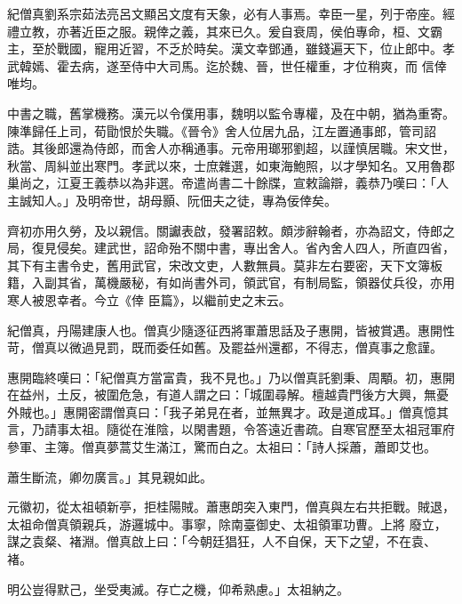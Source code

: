 
\begin{pinyinscope}

 紀僧真劉系宗茹法亮呂文顯呂文度有天象，必有人事焉。幸臣一星，列于帝座。經禮立教，亦著近臣之服。親倖之義，其來已久。爰自衰周，侯伯專命，桓、文霸主，至於戰國，寵用近習，不乏於時矣。漢文幸鄧通，雖錢遍天下，位止郎中。孝武韓嫣、霍去病，遂至侍中大司馬。迄於魏、晉，世任權重，才位稍爽，而
 信倖唯均。



 中書之職，舊掌機務。漢元以令僕用事，魏明以監令專權，及在中朝，猶為重寄。陳準歸任上司，荀勖恨於失職。《晉令》舍人位居九品，江左置通事郎，管司詔誥。其後郎還為侍郎，而舍人亦稱通事。元帝用瑯邪劉超，以謹慎居職。宋文世，秋當、周糾並出寒門。孝武以來，士庶雜選，如東海鮑照，以才學知名。又用魯郡巢尚之，江夏王義恭以為非選。帝遣尚書二十餘牒，宣敕論辯，義恭乃嘆曰：「人主誠知人。」及明帝世，胡母顥、阮佃夫之徒，專為佞倖矣。



 齊初亦用久勞，及以親信。關讞表啟，發署詔敕。頗涉辭翰者，亦為詔文，侍郎之局，復見侵矣。建武世，詔命殆不關中書，專出舍人。省內舍人四人，所直四省，其下有主書令史，舊用武官，宋改文吏，人數無員。莫非左右要密，天下文簿板籍，入副其省，萬機嚴秘，有如尚書外司，領武官，有制局監，領器仗兵役，亦用寒人被恩幸者。今立《倖
 臣篇》，以繼前史之末云。



 紀僧真，丹陽建康人也。僧真少隨逐征西將軍蕭思話及子惠開，皆被賞遇。惠開性苛，僧真以微過見罰，既而委任如舊。及罷益州還都，不得志，僧真事之愈謹。



 惠開臨終嘆曰：「紀僧真方當富貴，我不見也。」乃以僧真託劉秉、周顒。初，惠開在益州，土反，被圍危急，有道人謂之曰：「城圍尋解。檀越貴門後方大興，無憂外賊也。」惠開密謂僧真曰：「我子弟見在者，並無異才。政是道成耳。」僧真憶其言，乃請事太祖。隨從在淮陰，以閑書題，令答遠近書疏。自寒官歷至太祖冠軍府參軍、主簿。僧真夢蒿艾生滿江，驚而白之。太祖曰：「詩人採蕭，蕭即艾也。



 蕭生斷流，卿勿廣言。」其見親如此。



 元徽初，從太祖頓新亭，拒桂陽賊。蕭惠朗突入東門，僧真與左右共拒戰。賊退，太祖命僧真領親兵，游邏城中。事寧，除南臺御史、太祖領軍功曹。上將
 廢立，謀之袁粲、褚淵。僧真啟上曰：「今朝廷猖狂，人不自保，天下之望，不在袁、褚。



 明公豈得默己，坐受夷滅。存亡之機，仰希熟慮。」太祖納之。




\end{pinyinscope}

